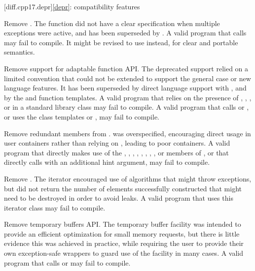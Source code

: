 [diff.cpp17.depr]{\ref{depr}: compatibility features}

\nodiffref
\change
Remove .
\rationale
The function did not have a clear specification when multiple exceptions were
active, and has been superseded by .
\effect
A valid \CppXVII{} program that calls  may fail
to compile. It might be revised to use  instead,
for clear and portable semantics.

\nodiffref
\change
Remove support for adaptable function API.
\rationale
The deprecated support relied on a limited convention that could not be
extended to support the general case or new language features. It has been
superseded by direct language support with , and by the
 and  function templates.
\effect
A valid \CppXVII{} program that relies on the presence of ,
, , or
 in a standard library class may fail to compile. A
valid \CppXVII{} program that calls  or , or uses the
class templates  or , may fail to
compile.

\nodiffref
\change
Remove redundant members from .
\rationale
{} was overspecified, encouraging direct usage in user containers
rather than relying on , leading to poor containers.
\effect
A valid \CppXVII{} program that directly makes use of the ,
, , ,
, , , , or
 members of , or that directly calls
 with an additional hint argument, may fail to compile.

\nodiffref
\change
Remove .
\rationale
The iterator encouraged use of algorithms that might throw exceptions, but did
not return the number of elements successfully constructed that might need to
be destroyed in order to avoid leaks.
\effect
A valid \CppXVII{} program that uses this iterator class may fail to compile.

\nodiffref
\change
Remove temporary buffers API.
\rationale
The temporary buffer facility was intended to provide an efficient optimization
for small memory requests, but there is little evidence this was achieved in
practice, while requiring the user to provide their own exception-safe wrappers
to guard use of the facility in many cases.
\effect
A valid \CppXVII{} program that calls  or
 may fail to compile.

